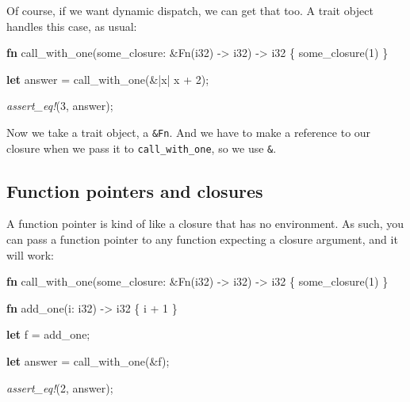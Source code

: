 \documentclass[a4paper,]{book}
\newenvironment{Shaded}{\begin{snugshade}}{\end{snugshade}}
\newcommand{\KeywordTok}[1]{\textcolor[rgb]{0.13,0.29,0.53}{\textbf{{#1}}}}
\newcommand{\DataTypeTok}[1]{\textcolor[rgb]{0.13,0.29,0.53}{{#1}}}
\newcommand{\DecValTok}[1]{\textcolor[rgb]{0.00,0.00,0.81}{{#1}}}
\newcommand{\BuiltInTok}[1]{{#1}}
\newcommand{\PreprocessorTok}[1]{\textcolor[rgb]{0.56,0.35,0.01}{\textit{{#1}}}}
\newcommand{\NormalTok}[1]{{#1}}
\begin{document}
Of course, if we want dynamic dispatch, we can get that too. A trait
object handles this case, as usual:

\begin{Shaded}
\begin{Highlighting}[]
\KeywordTok{fn} \NormalTok{call_with_one(some_closure: &}\BuiltInTok{Fn}\NormalTok{(}\DataTypeTok{i32}\NormalTok{) -> }\DataTypeTok{i32}\NormalTok{) -> }\DataTypeTok{i32} \NormalTok{\{}
    \NormalTok{some_closure(}\DecValTok{1}\NormalTok{)}
\NormalTok{\}}

\KeywordTok{let} \NormalTok{answer = call_with_one(&|x| x + }\DecValTok{2}\NormalTok{);}

\PreprocessorTok{assert_eq!}\NormalTok{(}\DecValTok{3}\NormalTok{, answer);}
\end{Highlighting}
\end{Shaded}

Now we take a trait object, a \texttt{\&Fn}. And we have to make a
reference to our closure when we pass it to \texttt{call\_with\_one}, so
we use \texttt{\&\textbar{}\textbar{}}.

\subsection{Function pointers and
closures}\label{function-pointers-and-closures}

A function pointer is kind of like a closure that has no environment. As
such, you can pass a function pointer to any function expecting a
closure argument, and it will work:

\begin{Shaded}
\begin{Highlighting}[]
\KeywordTok{fn} \NormalTok{call_with_one(some_closure: &}\BuiltInTok{Fn}\NormalTok{(}\DataTypeTok{i32}\NormalTok{) -> }\DataTypeTok{i32}\NormalTok{) -> }\DataTypeTok{i32} \NormalTok{\{}
    \NormalTok{some_closure(}\DecValTok{1}\NormalTok{)}
\NormalTok{\}}

\KeywordTok{fn} \NormalTok{add_one(i: }\DataTypeTok{i32}\NormalTok{) -> }\DataTypeTok{i32} \NormalTok{\{}
    \NormalTok{i + }\DecValTok{1}
\NormalTok{\}}

\KeywordTok{let} \NormalTok{f = add_one;}

\KeywordTok{let} \NormalTok{answer = call_with_one(&f);}

\PreprocessorTok{assert_eq!}\NormalTok{(}\DecValTok{2}\NormalTok{, answer);}
\end{Highlighting}
\end{Shaded}
\end{document}
